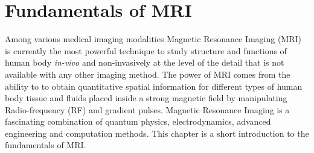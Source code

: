 \chapter{Fundamentals of MRI}
Among various medical imaging modalities Magnetic Resonance Imaging (MRI) is currently the most powerful technique to study structure and functions of human body \textit{in-vivo} and non-invasively at the level of the detail that is not available with any other imaging method. 
The power of MRI comes from the ability to to obtain quantitative spatial information for different types of human body tissue and fluids placed inside a strong magnetic field by manipulating Radio-frequency (RF) and gradient pulses. 
Magnetic Resonance Imaging is a fascinating combination of quantum physics, electrodynamics, advanced engineering and computation methods. 
This chapter is a short introduction to the fundamentals of MRI.
